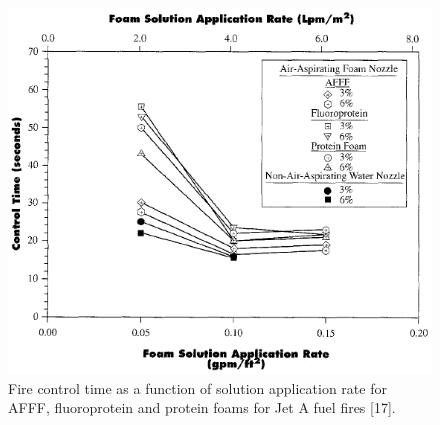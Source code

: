 \documentclass[12pt]{report}
\begin{document}
\begin{figure}[H]
    \centering
    \includegraphics[width=\textwidth]{fire_control_time_fuel_fires.png}
    \caption{Fire control time as a function of solution application rate for AFFF, fluoroprotein and protein foams for Jet A fuel fires [17].}
    \label{ch2:figure:fuel}
\end{figure}
\end{document}
